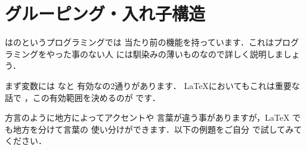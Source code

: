 

\section{グルーピング・入れ子構造}
{\laTEX}はのというプログラミングでは
当たり前の機能を持っています．これはプログラミングをやった事のない人
には馴染みの薄いものなので詳しく説明しましょう．

まず変数には
な{}と
有効な{}の2通りがあります．
{\LaTeX}においてもこれは重要な話で
，この有効範囲を決めるのが
です．

方言のように地方によってアクセントや
言葉が違う事がありますが，{\LaTeX}
でも地方を分けて言葉の
使い分けができます．以下の例題をご自分
で試してみてください．

\begin{InTeX}
\newcount\test%
\the\test%
{%
    \the\test%
   {%
       \the\test%
   }%
   \the\test%
}%
\the\test%
 \the\test%
\end{InTeX}

